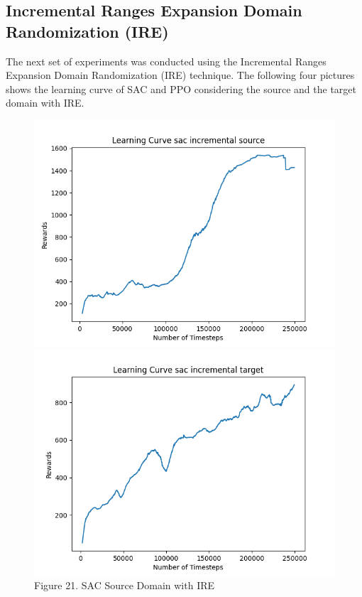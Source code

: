 \documentclass[12pt]{article}
\begin{document}
\subsection{Incremental Ranges Expansion Domain Randomization (IRE)}

The next set of experiments was conducted using the Incremental Ranges Expansion Domain Randomization (IRE) technique. The following four pictures shows the learning curve of SAC and PPO considering the source and the target domain with IRE.

\begin{figure}[H]
    \centering
    \begin{minipage}{0.45\textwidth}
        \centering
        \includegraphics[width=\textwidth]{../images/Learning_Curve_SAC_Incremental_Source.png}
        \caption{Figure 21. SAC Source Domain with IRE}
        \label{fig:sac_source_ire}
    \end{minipage}
    \hfill
    \begin{minipage}{0.45\textwidth}
        \centering
        \includegraphics[width=\textwidth]{../images/Learning_Curve_SAC_Incremental_Target.png}

\end{minipage}
\end{figure}
\end{document}
